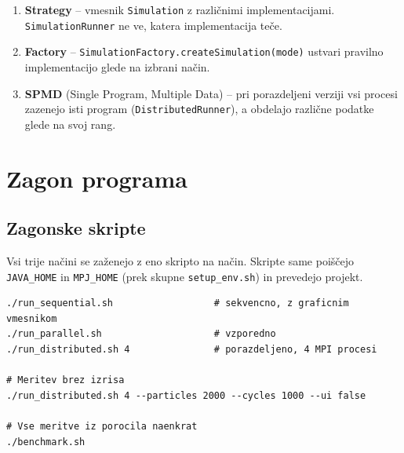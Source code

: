 \documentclass[12pt,a4paper]{article}
\begin{document}
\begin{enumerate}
    \item \textbf{Strategy} -- vmesnik \texttt{Simulation} z razli\v{c}nimi implementacijami. \texttt{SimulationRunner} ne ve, katera implementacija te\v{c}e.

    \item \textbf{Factory} -- \texttt{SimulationFactory.createSimulation(mode)} ustvari pravilno implementacijo glede na izbrani na\v{c}in.

    \item \textbf{SPMD} (Single Program, Multiple Data) -- pri porazdeljeni verziji vsi procesi zazenejo isti program (\texttt{DistributedRunner}), a obdelajo razli\v{c}ne podatke glede na svoj rang.
\end{enumerate}

\section{Zagon programa}

\subsection{Zagonske skripte}

Vsi trije na\v{c}ini se za\v{z}enejo z eno skripto na na\v{c}in. Skripte same poi\v{s}\v{c}ejo \texttt{JAVA\_HOME} in \texttt{MPJ\_HOME} (prek skupne \texttt{setup\_env.sh}) in prevedejo projekt.

\begin{verbatim}
./run_sequential.sh                  # sekvencno, z graficnim vmesnikom
./run_parallel.sh                    # vzporedno
./run_distributed.sh 4               # porazdeljeno, 4 MPI procesi

# Meritev brez izrisa
./run_distributed.sh 4 --particles 2000 --cycles 1000 --ui false

# Vse meritve iz porocila naenkrat
./benchmark.sh
\end{verbatim}
\end{document}
